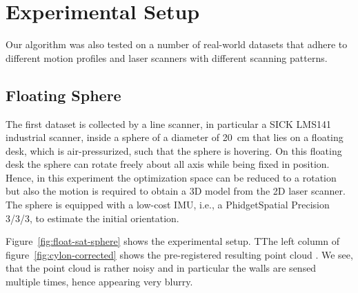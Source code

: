 \section{Experimental Setup}\label{sec:experimentalSetup}

Our algorithm was also tested on a number of real-world datasets that adhere to different motion profiles and laser scanners with different scanning patterns.  

\subsection{Floating Sphere}

The first dataset is collected by a line scanner, in particular a SICK LMS141 industrial scanner, inside a sphere of a diameter of \SI{20}{\centi\meter} that lies on a floating desk, which is air-pressurized, such that the sphere is hovering.
On this floating desk the sphere can rotate freely about all axis while being fixed in position. 
Hence, in this experiment the optimization space can be reduced to a rotation but also the motion is required to obtain a 3D model from the 2D laser scanner. 
The sphere is equipped with a low-cost IMU, i.e., a PhidgetSpatial Precision 3/3/3, to estimate the initial orientation. 

Figure~\ref{fig:float-sat-sphere} shows the experimental setup. TThe left column of figure~\ref{fig:cylon-corrected} shows the pre-registered resulting point cloud . 
We see, that the point cloud is rather noisy and in particular the walls are sensed multiple times, hence appearing very blurry. 

